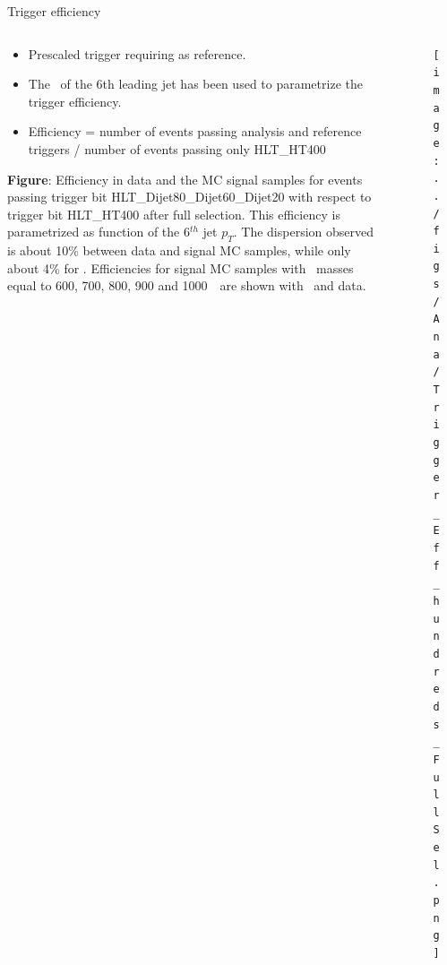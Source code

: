 \begin{frame}{Trigger efficiency}
\vspace{-.2cm}

\begin{columns}
\begin{column}{.50\textwidth}
   \begin{block}{}\scriptsize
     \begin{itemize}
     \item Prescaled trigger requiring  as reference.
     \item The \pt~of the 6th leading jet has been used to parametrize the trigger efficiency.
     \item Efficiency = number of events passing analysis and reference triggers / number of events passing only HLT\_HT400
     \end{itemize}
    \end{block}

\vspace{-.2cm}
    \begin{block}{}\tiny
      \textbf{Figure}: Efficiency in data and the MC signal samples for events passing trigger bit HLT\_Dijet80\_Dijet60\_Dijet20 with respect to trigger bit HLT\_HT400 after full selection. This efficiency is parametrized as function of the 6$^{th}$ jet $p_{T}$. The dispersion observed is about 10\% between data and signal MC samples, while only about 4\%  for \ttbar. Efficiencies for signal MC samples with \Tp~masses equal to 600, 700, 800, 900 and 1000~\GeVcc~are shown with \ttbar~and data.
    \end{block}
\end{column}

\begin{column}{.50\textwidth}
\begin{figure}[!Hhtbp]
  \begin{center}
    \texttt{[image: ../figs/Ana/Trigger\_Eff\_hundreds\_FullSel.png]}
    \label{fig:TrigEffPostMH}
  \end{center}
\end{figure}
\end{column}

\end{columns}


\end{frame}
